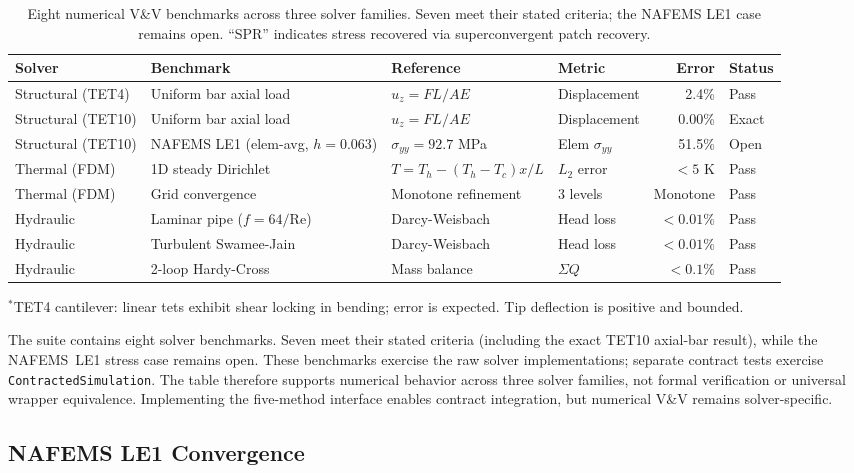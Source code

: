 \documentclass[journal]{IEEEtran}
\begin{document}
\begin{table}[t]
  \centering
  \caption{Eight numerical V\&V benchmarks across three solver families.
    Seven meet their stated criteria; the NAFEMS LE1 case remains open.
    ``SPR'' indicates stress recovered via superconvergent patch recovery.}
  \label{tab:vv-summary}
  \begin{tabular}{@{}llllrl@{}}
    \toprule
    Solver & Benchmark & Reference & Metric & Error & Status \\
    \midrule
    Structural (TET4) & Uniform bar axial load & $u_z = FL/AE$ & Displacement & 2.4\% & Pass \\
    Structural (TET10) & Uniform bar axial load & $u_z = FL/AE$ & Displacement & 0.00\% & Exact \\
    Structural (TET10) & NAFEMS LE1 (elem-avg, $h=0.063$) & $\sigma_{yy} = 92.7$ MPa & Elem $\sigma_{yy}$ & 51.5\% & Open \\
    Thermal (FDM) & 1D steady Dirichlet & $T = T_h - (T_h{-}T_c)x/L$ & $L_2$ error & $< 5$ K & Pass \\
    Thermal (FDM) & Grid convergence & Monotone refinement & 3 levels & Monotone & Pass \\
    Hydraulic & Laminar pipe ($f = 64/\text{Re}$) & Darcy-Weisbach & Head loss & $< 0.01\%$ & Pass \\
    Hydraulic & Turbulent Swamee-Jain & Darcy-Weisbach & Head loss & $< 0.01\%$ & Pass \\
    Hydraulic & 2-loop Hardy-Cross & Mass balance & $\Sigma Q$ & $< 0.1\%$ & Pass \\
    \bottomrule
  \end{tabular}
  \vspace{2pt}
  {\footnotesize $^*$TET4 cantilever: linear tets exhibit shear locking
    in bending; error is expected. Tip deflection is positive and bounded.}
\end{table}

The suite contains eight solver benchmarks. Seven meet their stated criteria
(including the exact TET10 axial-bar result), while the NAFEMS~LE1 stress case
remains open. These benchmarks exercise the raw solver implementations;
separate contract tests exercise \texttt{ContractedSimulation}. The table
therefore supports numerical behavior across three solver families, not formal
verification or universal wrapper equivalence. Implementing the five-method
interface enables contract integration, but numerical V\&V remains
solver-specific.

\subsection{NAFEMS LE1 Convergence}
\end{document}
